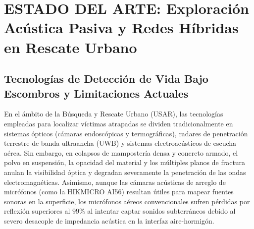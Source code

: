 \documentclass[11pt, a4paper]{article}
\begin{document}
\section{ESTADO DEL ARTE: Exploración Acústica Pasiva y Redes Híbridas en Rescate Urbano}

\subsection{Tecnologías de Detección de Vida Bajo Escombros y Limitaciones Actuales}
En el ámbito de la Búsqueda y Rescate Urbano (USAR), las tecnologías empleadas para localizar víctimas atrapadas se dividen tradicionalmente en sistemas ópticos (cámaras endoscópicas y termográficas), radares de penetración terrestre de banda ultraancha (UWB) y sistemas electroacústicos de escucha aérea. Sin embargo, en colapsos de mampostería densa y concreto armado, el polvo en suspensión, la opacidad del material y los múltiples planos de fractura anulan la visibilidad óptica y degradan severamente la penetración de las ondas electromagnéticas. Asimismo, aunque las cámaras acústicas de arreglo de micrófonos (como la HIKMICRO AI56) resultan útiles para mapear fuentes sonoras en la superficie, los micrófonos aéreos convencionales sufren pérdidas por reflexión superiores al $99\%$ al intentar captar sonidos subterráneos debido al severo desacople de impedancia acústica en la interfaz aire-hormigón.
\end{document}
